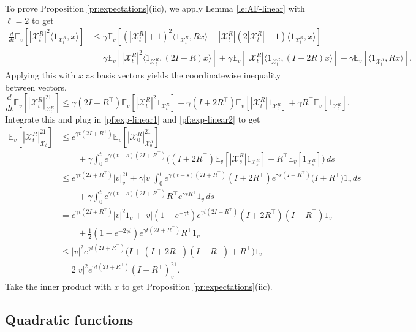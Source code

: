 \documentclass[11pt,reqno]{amsart}
\numberwithin{equation}{section}
\theoremstyle{definition}
\def\E{{\mathbb E}}
\def\X{{\mathcal X}}
\begin{document}
To prove Proposition \ref{pr:expectations}(iic), we apply Lemma \ref{le:AF-linear} with $\ell=2$ to get
\begin{align*}
\frac{d}{dt} \E_v[|\X^{R}_t|^2 \langle 1_{\X^{R}_t},x\rangle ] &\le \gamma \E_v[ (|\X^{R}_t|+1)^2\langle 1_{\X^{R}_t},R x\rangle +  |\X^{R}_t|(2|\X^{R}_t|+1)\langle 1_{\X^{R}_t}, x\rangle ] \\
	&= \gamma \E_v[ |\X^{R}_t|^2\langle 1_{\X^{R}_t},(2I+R) x\rangle] + \gamma \E_v[ |\X^{R}_t| \langle 1_{\X^{R}_t},(I+2R) x\rangle] + \gamma \E_v[  \langle 1_{\X^{R}_t},R x\rangle].
\end{align*}
Applying this with $x$ as basis vectors yields the coordinatewise inequality between vectors,
\begin{equation*}
\frac{d}{dt} \E_v[ |\X^{R}_t|^21_{\X^{R}_t} ] \le \gamma(2I + R^\top) \E_v[ |\X^{R}_t|^2 1_{\X^{R}_t}] +  \gamma (I + 2R^\top) \E_v[|\X^{R}_t|1_{\X^{R}_t}] + \gamma R^\top\E_v[1_{\X^{R}_t}] .
\end{equation*}
Integrate this and plug in \eqref{pf:exp-linear1} and \eqref{pf:exp-linear2} to get
\begin{align*}
\E_v[ |\X^{R}_t|^21_{\X_t} ] &\le e^{\gamma t (2I+R^\top)}\E_v[ |\X^{R}_0|^21_{\X^{R}_0} ] \\
& \qquad + \gamma \int_0^t e^{\gamma(t-s)(2I+R^\top)} \Big(  ( I+2R^\top) \E_v[|\X^{R}_s|1_{\X^{R}_s}] +  R^\top\E_v[1_{\X^{R}_s}]\Big)\,ds \\
	&\le e^{\gamma t (2I+R^\top)}|v|^21_{v}   + \gamma |v| \int_0^t e^{\gamma(t-s)(2I+R^\top)} ( I+2R^\top) e^{\gamma s (I+R^\top)}\Big(I +  R^\top  \Big) 1_v  \,ds \\
	&\qquad + \gamma \int_0^t e^{\gamma(t-s)(2I+R^\top)} R^\top e^{\gamma s R^\top} 1_v\,ds \\
	&= e^{\gamma t (2I+R^\top)} |v|^2 1_v  +  |v|(1-e^{-\gamma t})e^{\gamma t (2I+R^\top)}(I + 2R^\top)(I + R^\top)1_v \\
	&\qquad + \frac12(1-e^{-2\gamma t})e^{\gamma t (2I+R^\top)}R^\top 1_v \\
	&\le |v|^2e^{\gamma t (2I+R^\top)}\bigg( I + (I + 2R^\top)( I + R^\top) + R^\top \bigg)1_v \\ 
	&= 2|v|^2 e^{\gamma t (2I+R^\top)}(I+R^\top)^21_v.
\end{align*}
Take the inner product with $x$ to get Proposition \ref{pr:expectations}(iic).



\subsection{Quadratic functions}
\end{document}
